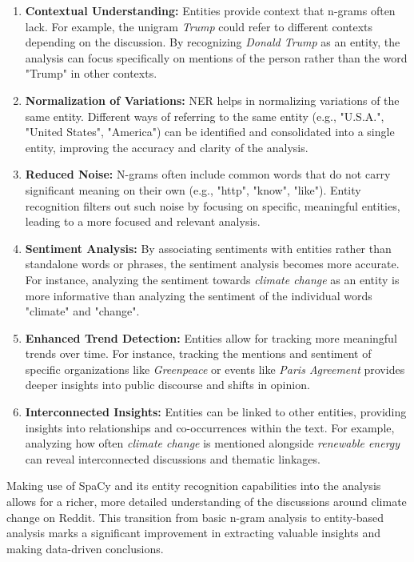 \begin{enumerate}
    \item \textbf{Contextual Understanding:} Entities provide context that n-grams often lack. For example, the unigram \emph{Trump} could refer to different contexts depending on the discussion. By recognizing \emph{Donald Trump} as an entity, the analysis can focus specifically on mentions of the person rather than the word "Trump" in other contexts.
    \item \textbf{Normalization of Variations:} NER helps in normalizing variations of the same entity. Different ways of referring to the same entity (e.g., "U.S.A.", "United States", "America") can be identified and consolidated into a single entity, improving the accuracy and clarity of the analysis.
    \item \textbf{Reduced Noise:} N-grams often include common words that do not carry significant meaning on their own (e.g., "http", "know", "like"). Entity recognition filters out such noise by focusing on specific, meaningful entities, leading to a more focused and relevant analysis.
    \item \textbf{Sentiment Analysis:} By associating sentiments with entities rather than standalone words or phrases, the sentiment analysis becomes more accurate. For instance, analyzing the sentiment towards \emph{climate change} as an entity is more informative than analyzing the sentiment of the individual words "climate" and "change".
    \item \textbf{Enhanced Trend Detection:} Entities allow for tracking more meaningful trends over time. For instance, tracking the mentions and sentiment of specific organizations like \emph{Greenpeace} or events like \emph{Paris Agreement} provides deeper insights into public discourse and shifts in opinion.
    \item \textbf{Interconnected Insights:} Entities can be linked to other entities, providing insights into relationships and co-occurrences within the text. For example, analyzing how often \emph{climate change} is mentioned alongside \emph{renewable energy} can reveal interconnected discussions and thematic linkages.
\end{enumerate}

Making use of SpaCy and its entity recognition capabilities into the analysis allows for a richer, more detailed understanding of the discussions around climate change on Reddit. This transition from basic n-gram analysis to entity-based analysis marks a significant improvement in extracting valuable insights and making data-driven conclusions.

